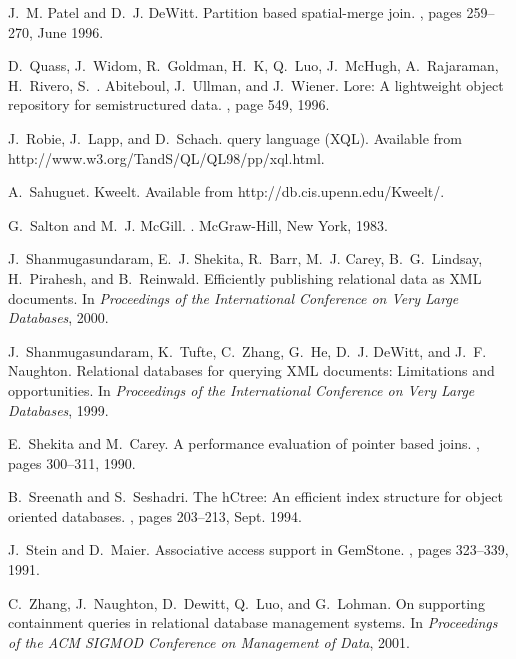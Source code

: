 \documentclass[fleqn,11pt]{article}
\newcommand{\cheatbaseline}{1.44}
\renewcommand{\baselinestretch}{\cheatbaseline}
\begin{document}
\begin{small}
{
J.~M. Patel and D.~J. DeWitt.
\newblock Partition based spatial-merge join.
, pages 259--270, June 1996.

D.~Quass, J.~Widom, R.~Goldman, H.~K, Q.~Luo, J.~McHugh, A.~Rajaraman,
  H.~Rivero, S.~. Abiteboul, J.~Ullman, and J.~Wiener.
\newblock Lore: A lightweight object repository for semistructured data.
, page 549, 1996.

J.~Robie, J.~Lapp, and D.~Schach.
 query language ({XQL}).
\newblock Available from http://www.w3.org/TandS/QL/QL98/pp/xql.html.

A.~Sahuguet.
\newblock Kweelt.
\newblock Available from http://db.cis.upenn.edu/Kweelt/.

G.~Salton and M.~J. McGill.
.
\newblock McGraw-Hill, New York, 1983.

J.~Shanmugasundaram, E.~J. Shekita, R.~Barr, M.~J. Carey, B.~G.~Lindsay,
  H.~Pirahesh, and B.~Reinwald.
\newblock Efficiently publishing relational data as {XML} documents.
\newblock In {\em Proceedings of the International Conference on Very Large
  Databases}, 2000.

J.~Shanmugasundaram, K.~Tufte, C.~Zhang, G.~He, D.~J. DeWitt, and J.~F.
  Naughton.
\newblock Relational databases for querying {XML} documents: Limitations and
  opportunities.
\newblock In {\em Proceedings of the International Conference on Very Large
  Databases}, 1999.

E.~Shekita and M.~Carey.
\newblock A performance evaluation of pointer based joins.
, pages 300--311, 1990.

B.~Sreenath and S.~Seshadri.
\newblock The hCtree: An efficient index structure for object oriented
  databases.
, pages 203--213, Sept. 1994.

J.~Stein and D.~Maier.
\newblock Associative access support in GemStone.
, pages 323--339, 1991.

C.~Zhang, J.~Naughton, D.~Dewitt, Q.~Luo, and G.~Lohman.
\newblock On supporting containment queries in relational database management
  systems.
\newblock In {\em Proceedings of the ACM SIGMOD Conference on Management of
  Data}, 2001.
}

\end{small}
\renewcommand{\baselinestretch}{\cheatbaseline}
\end{document}
